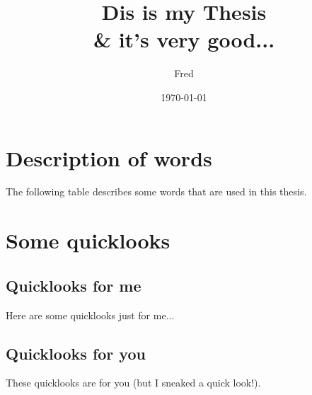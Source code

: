 \documentclass{fsthesis}
\begin{document}
\title{Dis is my Thesis\\ \& it's very good...}
\author{Fred}            %
\date{\today}%
\maketitle

\tableofcontents
\typeout{****}
\typeout{****}


%



\appendix
\chapter{Description of words}
The following table describes some words that are used in this thesis.

\chapter{Some quicklooks}
\section{Quicklooks for me}
Here are some quicklooks just for me...

\section{Quicklooks for you}
These quicklooks are for you (but I sneaked a quick look!).
\end{document}
